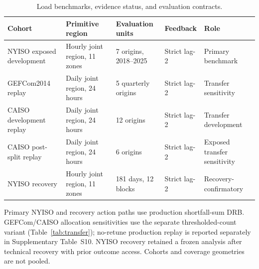 
\begin{table}[!tbp]
\centering
\caption{Load benchmarks, evidence status, and evaluation contracts.}
\label{tab:contracts}
\scriptsize
\renewcommand{\arraystretch}{0.90}
\begin{tabular}{p{}p{}p{}p{}p{}}
\toprule
Cohort & Primitive region & Evaluation units & Feedback & Role \\
\midrule
NYISO exposed development & Hourly joint region, 11 zones & 7 origins, 2018--2025 & Strict lag-2 & Primary benchmark \\
GEFCom2014 replay & Daily joint region, 24 hours & 5 quarterly origins & Strict lag-2 & Transfer sensitivity \\
CAISO development replay & Daily joint region, 24 hours & 12 origins & Strict lag-2 & Transfer development \\
CAISO post-split replay & Daily joint region, 24 hours & 6 origins & Strict lag-2 & Exposed transfer sensitivity \\
NYISO recovery & Hourly joint region, 11 zones & 181 days, 12 blocks & Strict lag-2 & Recovery-confirmatory \\
\bottomrule
\end{tabular}
\par\footnotesize Primary NYISO and recovery action paths use production shortfall-sum DRB. GEFCom/CAISO allocation sensitivities use the separate thresholded-count variant (Table~\ref{tab:transfer}); no-retune production replay is reported separately in Supplementary Table~S10. NYISO recovery retained a frozen analysis after technical recovery with prior outcome access. Cohorts and coverage geometries are not pooled.
\end{table}

